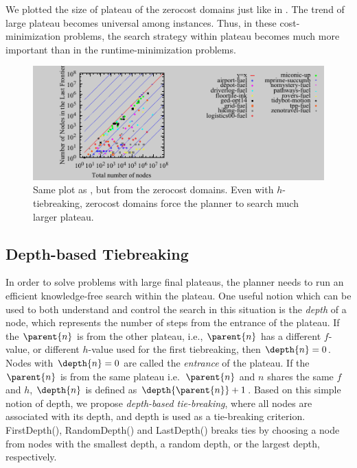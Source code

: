 We plotted the size of plateau of the zerocost domains just like in
. The trend of large plateau becomes universal among
instances. Thus, in these cost-minimization problems, the search strategy within
plateau becomes much more important than in the
runtime-minimization problems.

\begin{figure}[tb]
 \centering {}
  \includegraphics{tables/aaai16-frontier/zerocost/lmcut_frontier-front.pdf}
  \caption{Same plot as , but from the zerocost
  domains. Even with $h$-tiebreaking, zerocost domains force the planner
  to search much larger plateau.}
 \label{plateau-zerocost}
\end{figure}



\subsection{Depth-based Tiebreaking}

In order to solve problems with large final plateaus, the
planner needs to run an efficient knowledge-free search within the
plateau.  One useful notion which can be used to both understand and control the search in this
situation is the \emph{depth} of a node, which represents the number 
of steps from the entrance of the plateau.
If the $\parent{n}$ is from the other plateau, i.e., $\parent{n}$ has a
different $f$-value, or different $h$-value used for the first
tiebreaking, then $\depth{n} = 0$. Nodes with $\depth{n} = 0$ are called
the \emph{entrance} of the plateau.
If the $\parent{n}$ is from the same plateau i.e.\ $\parent{n}$ and $n$
shares the same $f$ and $h$,
$\depth{n}$ is defined as $\depth{\parent{n}} + 1$.
Based on this simple notion of depth,
we propose  \emph{depth-based tie-breaking}, where all nodes are associated with its depth, 
and depth is used as a tie-breaking criterion.
FirstDepth(\fd), RandomDepth(\rd) and LastDepth(\ld) breaks ties by choosing a node from 
nodes with the smallest depth, a random depth, or the largest depth, respectively.

